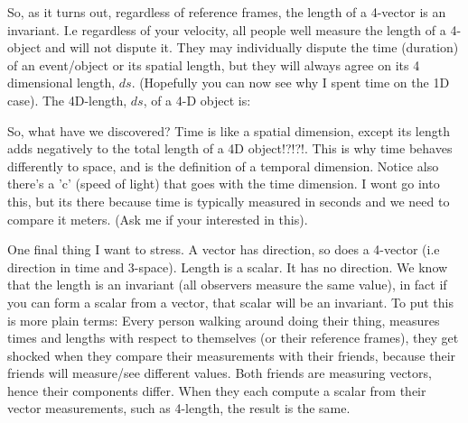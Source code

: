 So, as it turns out, regardless of reference frames, the length of a 4-vector is an invariant. I.e regardless of your velocity, all people well measure the length of a 4-object and will not dispute it. They may individually dispute the time (duration) of an event/object or its spatial length, but they will always agree on its 4 dimensional length, $ds$. (Hopefully you can now see why I spent time on the 1D case). The 4D-length, $ds$,  of a 4-D object is:


So, what have we discovered? Time is like a spatial dimension, except its length adds negatively to the total length of a 4D object!?!?!. This is why time behaves differently to space, and is the definition of a temporal dimension. Notice also there's a 'c' (speed of light) that goes with the time dimension. I wont go into this, but its there because time is typically measured in seconds and we need to compare it meters. (Ask me if your interested in this). 

One final thing I want to stress. A vector has direction, so does a 4-vector (i.e direction in time and 3-space). Length is a scalar. It has no direction. We know that the length is an invariant (all observers measure the same value), in fact if you can form a scalar from a vector, that scalar will be an invariant. To put this is more plain terms: Every person walking around doing their thing, measures times and lengths with respect to themselves (or their reference frames), they get shocked when they compare their measurements with their friends, because their friends will measure/see different values. Both friends are measuring vectors, hence their components differ. When they each compute a scalar from their vector measurements, such as 4-length, the result is the same. 



